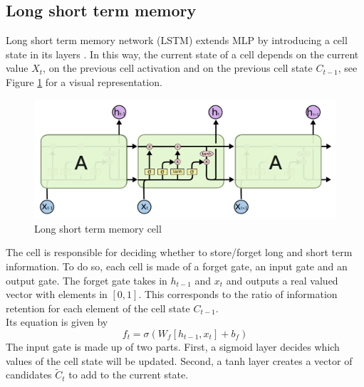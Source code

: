
\subsection{Long short term memory}

Long short term memory network (LSTM) extends MLP by introducing a cell state in its layers \cite{hochreiter1997long}. In this way, the current state of a cell depends on the current value $X_t$, on the previous cell activation and on the previous cell state $C_{t-1}$, see Figure \ref{fig:lstm_cell} for a visual representation. 
\begin{figure}[!h]
    \includegraphics[width=\textwidth]{images/lstm_cell.png}
    \caption{Long short term memory cell \cite{Han2024}}
    \label{fig:lstm_cell}
\end{figure}
The cell is responsible for deciding whether to store/forget long and short term information. To do so, each cell is made of a forget gate, an input gate and an output gate.
The forget gate takes in $h_{t-1}$ and $x_t$ and outputs a real valued vector with elements in $[0,1]$. This corresponds to the ratio of information retention for each element of the cell state $C_{t-1}$.
\\
Its equation is given by
\begin{equation}
    f_t=\sigma(W_f[h_{t-1},x_t]+b_f)
\end{equation}
The input gate is made up of two parts. First, a sigmoid layer decides which values of the cell state will be updated. Second, a tanh layer creates a vector of candidates $\tilde{C}_t$ to add to the current state.
